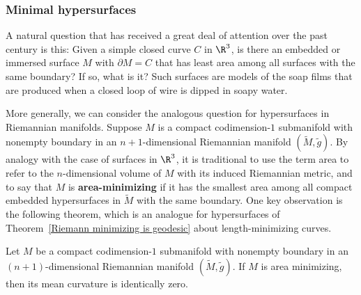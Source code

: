 \subsubsection{Minimal hypersurfaces}
A natural question that has received a great deal of attention over the past century is this: Given a simple closed curve $C$ in $\R^3$, is there an embedded or immersed 
surface $M$ with $\partial M=C$ that has least area among all surfaces with the same boundary? If so, what is it? Such surfaces are models of the soap films that are 
produced when a closed loop of wire is dipped in soapy water.\par
More generally, we can consider the analogous question for hypersurfaces in Riemannian manifolds. Suppose $M$ is a compact codimension-$1$ submanifold with nonempty 
boundary in an $n+1$-dimensional Riemannian manifold $(\widetilde{M},\tilde{g})$. By analogy with the case of surfaces in $\R^3$, it is traditional to use the term 
area to refer to the $n$-dimensional volume of $M$ with its induced Riemannian metric, and to say that $M$ is \textbf{area-minimizing} if it has the smallest area among 
all compact embedded hypersurfaces in $\widetilde{M}$ with the same boundary. One key observation is the following theorem, which is an analogue for hypersurfaces of 
Theorem~\ref{Riemann minimizing is geodesic} about length-minimizing curves.
\begin{theorem}\label{Riemann hypersurface minimizing area mean curvature}
Let $M$ be a compact codimension-$1$ submanifold with nonempty boundary in an $(n+1)$-dimensional Riemannian manifold  $(\widetilde{M},\tilde{g})$. If $M$ is 
area minimizing, then its mean curvature is identically zero.
\end{theorem}
